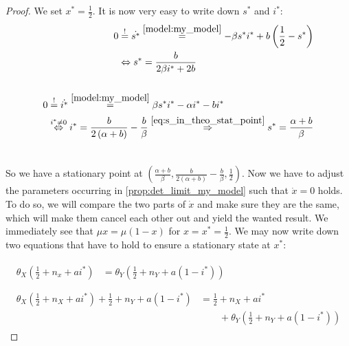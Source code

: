 \documentclass[12pt,a4paper,twoside]{article}
\begin{document}
\begin{proof}
	We set $x^* = \frac{1}{2}$. It is now very easy to write down $s^*$ and $i^*$:
	\begin{align}
	\begin{split}\label{eq:s_in_theo_stat_point}
		0 &\overset{!}{=} \dot{s^*} \overset{\eqref{model:my_model}}{=}-\beta s^*i^* + b \left(\frac{1}{2} - s^*\right)\\
		&\Leftrightarrow s^* = \frac{b}{2\beta i^*+ 2b}\\
		&\end{split}\\
		\begin{split}
		0 &\overset{!}{=} \dot{i^*} \overset{\eqref{model:my_model}}{=}\beta s^*i^* -\alpha i^* - bi^*\\
		&\overset{i^* \neq 0}{\Leftrightarrow} i^* = \frac{b}{2\left(\alpha + b\right)} - \frac{b}{\beta} \overset{\eqref{eq:s_in_theo_stat_point}}{\Rightarrow} s^* = \frac{\alpha + b}{\beta}\\
		&\end{split}
	\end{align}
	
	So we have a stationary point at $\left(\frac{\alpha + b}{\beta}, \frac{b}{2\left(\alpha + b\right)} - \frac{b}{\beta}, \frac{1}{2}\right)$. Now we have to adjust the parameters occurring in \eqref{prop:det_limit_my_model} such that $\dot{x} = 0$ holds. To do so, we will compare the two parts of $\dot{x}$ and make sure they are the same, which will make them cancel each other out and yield the wanted result. We immediately see that $\mu x = \mu\left(1-x\right)$ for $x = x^* = \frac{1}{2}$. We may now write down two equations that have to hold to ensure a stationary state at $x^*$:
	
	\begin{align}
		\begin{split}\label{eq:numerator_equality}
		\theta_X\left(\frac{1}{2}+n_x+ai^*\right) &= \theta_Y\left(\frac{1}{2}+n_Y+a(1-i^*)\right)\\
		&\end{split}\\
		\begin{split}\label{eq:denominator_equality}
		\theta_X\left(\frac{1}{2}+n_X+ai^*\right) + \frac{1}{2}+n_Y+a(1-i^*) &= \frac{1}{2}+n_X+ai^*\\
		&\qquad +\theta_Y\left(\frac{1}{2}+n_Y+a(1-i^*)\right)\end{split}
	\end{align}
	

\end{proof}
\end{document}

